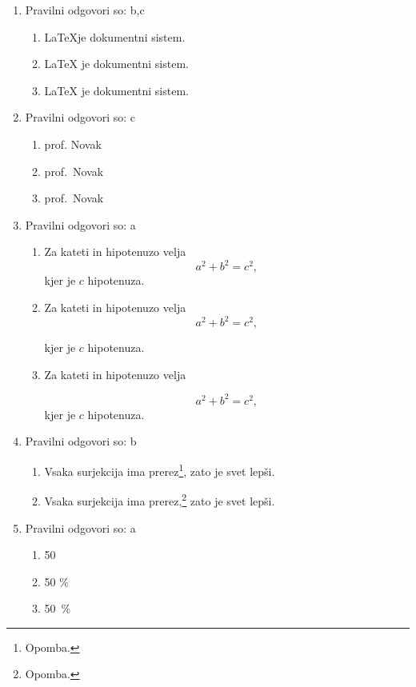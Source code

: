 \documentclass[11pt]{article}
\begin{document}
\begin{enumerate}
    \item Pravilni odgovori so: b,c %
    \begin{enumerate}
        \item \LaTeX je dokumentni sistem.
        \item {\LaTeX} je dokumentni sistem.
        \item \LaTeX{} je dokumentni sistem.
    \end{enumerate}

    \item Pravilni odgovori so: c %
    \begin{enumerate}
        \item prof. Novak
        \item prof.~Novak
        \item prof.\ Novak
    \end{enumerate}

    \item Pravilni odgovori so: a%
    \begin{enumerate}
        \item
Za kateti in hipotenuzo velja
\[
  a^2 + b^2 = c^2,
\]
kjer je \(c\) hipotenuza.
        \item
Za kateti in hipotenuzo velja
\[
  a^2 + b^2 = c^2,
\]

kjer je \(c\) hipotenuza.
        \item
Za kateti in hipotenuzo velja

\[
  a^2 + b^2 = c^2,
\]
kjer je \(c\) hipotenuza.
    \end{enumerate}

    \item Pravilni odgovori so: b%
    \begin{enumerate}
        \item Vsaka surjekcija ima prerez\footnote{Opomba.}, zato je svet lepši.
        \item Vsaka surjekcija ima prerez,\footnote{Opomba.} zato je svet lepši.
    \end{enumerate}

    \item Pravilni odgovori so: a %
    \begin{enumerate}
        \item 50 %
        \item 50 \%
        \item 50~\%
    \end{enumerate}


\end{enumerate}
\end{document}
